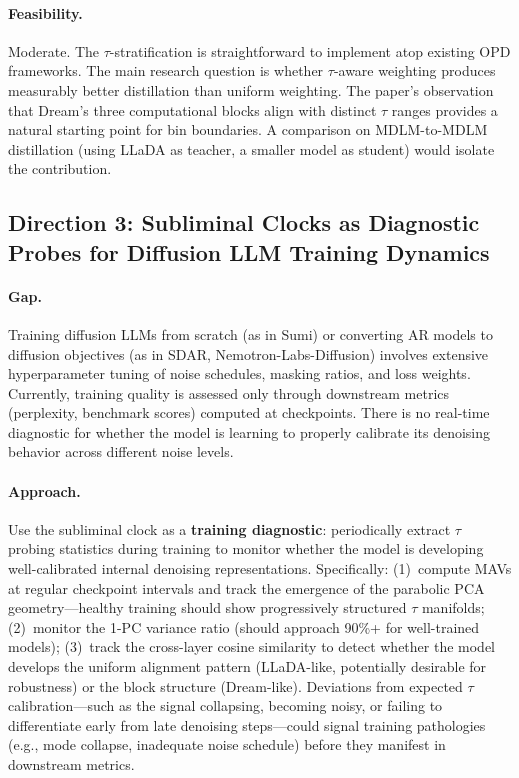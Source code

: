 \documentclass[11pt,a4paper]{article}
\begin{document}
\paragraph{Feasibility.}
Moderate. The $\tau$-stratification is straightforward to implement atop existing OPD frameworks. The main research question is whether $\tau$-aware weighting produces measurably better distillation than uniform weighting. The paper's observation that Dream's three computational blocks align with distinct $\tau$ ranges provides a natural starting point for bin boundaries. A comparison on MDLM-to-MDLM distillation (using LLaDA as teacher, a smaller model as student) would isolate the contribution.

\subsection{Direction 3: Subliminal Clocks as Diagnostic Probes for Diffusion LLM Training Dynamics}

\paragraph{Gap.}
Training diffusion LLMs from scratch (as in Sumi) or converting AR models to diffusion objectives (as in SDAR, Nemotron-Labs-Diffusion) involves extensive hyperparameter tuning of noise schedules, masking ratios, and loss weights. Currently, training quality is assessed only through downstream metrics (perplexity, benchmark scores) computed at checkpoints. There is no real-time diagnostic for whether the model is learning to properly calibrate its denoising behavior across different noise levels.

\paragraph{Approach.}
Use the subliminal clock as a \textbf{training diagnostic}: periodically extract $\tau$ probing statistics during training to monitor whether the model is developing well-calibrated internal denoising representations. Specifically: (1)~compute MAVs at regular checkpoint intervals and track the emergence of the parabolic PCA geometry---healthy training should show progressively structured $\tau$ manifolds; (2)~monitor the 1-PC variance ratio (should approach 90\%+ for well-trained models); (3)~track the cross-layer cosine similarity to detect whether the model develops the uniform alignment pattern (LLaDA-like, potentially desirable for robustness) or the block structure (Dream-like). Deviations from expected $\tau$ calibration---such as the signal collapsing, becoming noisy, or failing to differentiate early from late denoising steps---could signal training pathologies (e.g., mode collapse, inadequate noise schedule) before they manifest in downstream metrics.
\end{document}
